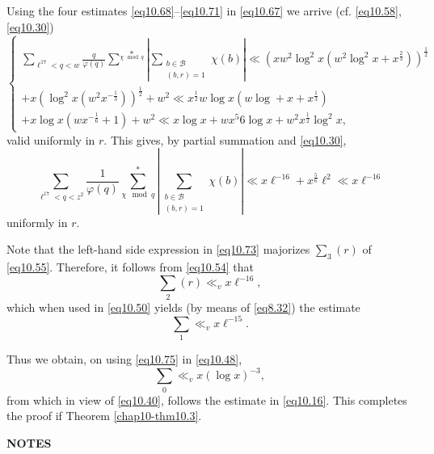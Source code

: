 Using the four estimates \eqref{eq10.68}--\eqref{eq10.71} in
\eqref{eq10.67} we arrive (cf. \eqref{eq10.58}, \eqref{eq10.30}) 
\begin{equation*}
\begin{cases}
\sum\limits_{\ell^{17}< q<w} \frac{q}{\varphi (q)} \sum^*\limits_{\chi
  \mod q} | \sum\limits_{\substack{b \in \mathscr{B} \\ (b,r)=1}} \chi(b)
| \ll (x w^2 \log^2 x (w^2 \log^2 x+x^{\frac{2}{3}}))^{\frac{1}{2}}\\
+ x (\log^2 x (w^2 x ^{-\frac{1}{3}}))^{\frac{1}{2}} + w^2 \ll
x^{\frac{1}{2}} w \log x (w \log   + x + x^{\frac{1}{3}})\\
+ x \log x(w
x ^{-\frac{1}{6}}+1 ) + w^2 \ll x \log x + wx^{5}{6} \log x + w^2
x^{\frac{1}{2}} \log ^2 x,  
\end{cases}\tag{10.72}\label{eq10.72}
\end{equation*}
valid uniformly in $r$. This gives, by partial summation and
\eqref{eq10.30}, 
\begin{equation*}
\sum_{\ell^{17}<q<z^2} \frac{1}{\varphi (q)} \sum^*_{\chi \mod q} |
\sum_{\substack{b \in \mathscr{B} \\ (b,r)=1}} \chi (b) | \ll x
\ell^{-16}+ x^{\frac{5}{6}} \ell^2 \ll x \ell^{-16} \tag{10.73}\label{eq10.73} 
\end{equation*}\pageoriginale
uniformly in $r$.

Note that the left-hand side expression in \eqref{eq10.73} majorizes $\sum_3
(r)$ of \eqref{eq10.55}. Therefore, it  follows from \eqref{eq10.54} that 
\begin{equation*}
\sum_2 (r) \ll_v x \ell^{-16}, \tag{10.74}\label{eq10.74}
\end{equation*}
which when used in \eqref{eq10.50} yields (by means of \eqref{eq8.32})
the estimate 
\begin{equation*}
\sum_1 \ll_v x \ell^{-15}. \tag{10.75}\label{eq10.75}
\end{equation*}

Thus we obtain, on using \eqref{eq10.75} in \eqref{eq10.48},
\begin{equation*}
\sum_0 \ll_v x (\log x)^{-3},\tag{10.76}\label{eq10.76} 
\end{equation*}
from which in view of \eqref{eq10.40}, follows the estimate in
\eqref{eq10.16}. This completes the proof if Theorem
\ref{chap10-thm10.3}.  

\begin{center}
\textbf{NOTES}
\end{center}

